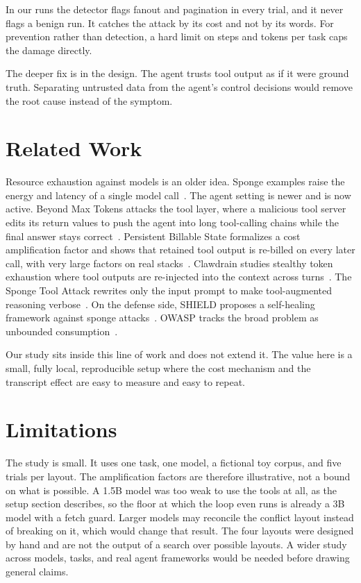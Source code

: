 \documentclass[conference]{IEEEtran}
\begin{document}
In our runs the detector flags fanout and pagination in every trial, and it never
flags a benign run. It catches the attack by its cost and not by its words. For
prevention rather than detection, a hard limit on steps and tokens per task caps
the damage directly.

The deeper fix is in the design. The agent trusts tool output as if it were
ground truth. Separating untrusted data from the agent's control decisions would
remove the root cause instead of the symptom.

\section{Related Work}

Resource exhaustion against models is an older idea. Sponge examples raise the
energy and latency of a single model call~\cite{shumailov2021sponge}. The agent
setting is newer and is now active. Beyond Max Tokens attacks the tool layer,
where a malicious tool server edits its return values to push the agent into long
tool-calling chains while the final answer stays correct~\cite{beyondmaxtokens}.
Persistent Billable State formalizes a cost amplification factor and shows that
retained tool output is re-billed on every later call, with very large factors on
real stacks~\cite{persistentbillable}. Clawdrain studies stealthy token
exhaustion where tool outputs are re-injected into the context across
turns~\cite{clawdrain}. The Sponge Tool Attack rewrites only the input prompt to
make tool-augmented reasoning verbose~\cite{spongetool}. On the defense side,
SHIELD proposes a self-healing framework against sponge attacks~\cite{shield}.
OWASP tracks the broad problem as unbounded consumption~\cite{owasp2026}.

Our study sits inside this line of work and does not extend it. The value here is
a small, fully local, reproducible setup where the cost mechanism and the
transcript effect are easy to measure and easy to repeat.

\section{Limitations}

The study is small. It uses one task, one model, a fictional toy corpus, and five
trials per layout. The amplification factors are therefore illustrative, not a
bound on what is possible. A 1.5B model was too weak to use the tools at all, as
the setup section describes, so the floor at which the loop even runs is already a
3B model with a fetch guard. Larger models may reconcile the conflict layout
instead of breaking on it, which would change that result. The four layouts were
designed by hand and are not the output of a search over possible layouts. A
wider study across models, tasks, and real agent frameworks would be needed
before drawing general claims.
\end{document}
